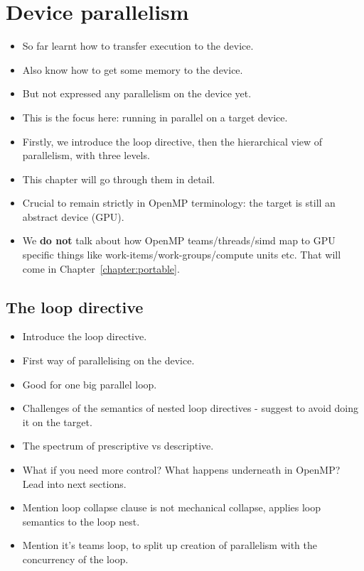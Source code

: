 
\def\ArtDir{04.DevPar/figures}%


\chapter{Device parallelism}
\label{chapter:parallelism}

\begin{itemize}
  \item So far learnt how to transfer execution to the device.
  \item Also know how to get some memory to the device.
  \item But not expressed any parallelism on the device yet.
  \item This is the focus here: running in parallel on a target device.
  \item Firstly, we introduce the loop directive, then the hierarchical view of parallelism, with three levels.
  \item This chapter will go through them in detail.
  \item Crucial to remain strictly in OpenMP terminology: the target is still an abstract device (GPU).
  \item We {\bf do not} talk about how OpenMP teams/threads/simd map to GPU specific things like work-items/work-groups/compute units etc. That will come in Chapter~\ref{chapter:portable}.
\end{itemize}

\section{The loop directive}
\begin{itemize}
  \item Introduce the loop directive.
  \item First way of parallelising on the device.
  \item Good for one big parallel loop.
  \item Challenges of the semantics of nested loop directives - suggest to avoid doing it on the target.
  \item The spectrum of prescriptive vs descriptive.
  \item What if you need more control? What happens underneath in OpenMP? Lead into next sections.
  \item Mention loop collapse clause is not mechanical collapse, applies loop semantics to the loop nest.
  \item Mention it's teams loop, to split up creation of parallelism with the concurrency of the loop.
\end{itemize}

